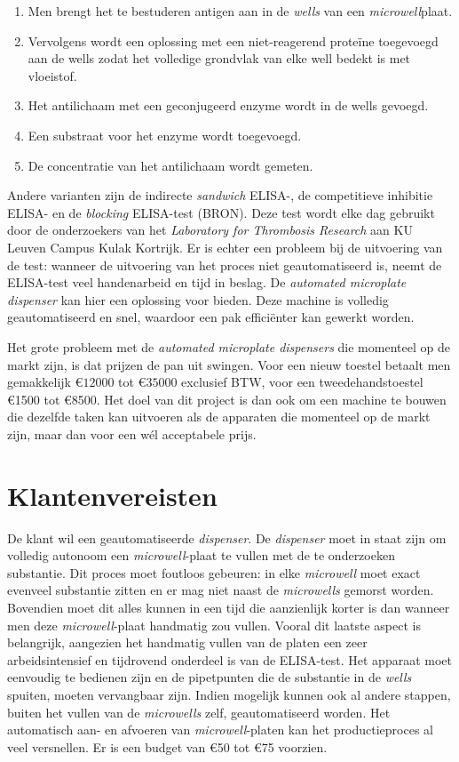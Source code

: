 \documentclass[a4paper,twoside,kulak]{kulakreport} %
\begin{document}
\begin{enumerate}
	\item Men brengt het te bestuderen antigen aan in de \textit{wells} van een \textit{microwell}plaat.
	\item Vervolgens wordt een oplossing met een niet-reagerend proteïne toegevoegd aan de wells zodat het volledige grondvlak van elke well bedekt is met vloeistof.
	\item Het antilichaam met een geconjugeerd enzyme wordt in de wells gevoegd.
	\item Een substraat voor het enzyme wordt toegevoegd. 
	\item De concentratie van het antilichaam wordt gemeten.
\end{enumerate}
Andere varianten zijn de indirecte \textit{sandwich} ELISA-, de competitieve inhibitie ELISA- en de \textit{blocking} ELISA-test (BRON).
Deze test wordt elke dag gebruikt door de onderzoekers van het \textit{Laboratory for Thrombosis Research} aan KU Leuven Campus Kulak Kortrijk. Er is echter een probleem bij de uitvoering van de test: wanneer de uitvoering van het proces niet geautomatiseerd is, neemt de ELISA-test veel handenarbeid en tijd in beslag. De \textit{automated microplate dispenser} kan hier een oplossing voor bieden. Deze machine is volledig geautomatiseerd en snel, waardoor een pak efficiënter kan gewerkt worden. 

Het grote probleem met de \textit{automated microplate dispensers} die momenteel op de markt zijn, is dat prijzen de pan uit swingen. Voor een nieuw toestel betaalt men gemakkelijk \euro $12000$ tot \euro $35000$\cite{BioSPX} exclusief BTW, voor een tweedehandstoestel \euro 1500 tot \euro 8500\cite{LabX}. Het doel van dit project is dan ook om een machine te bouwen die dezelfde taken kan uitvoeren als de apparaten die momenteel op de markt zijn, maar dan voor een wél acceptabele prijs.


\chapter{Klantenvereisten}
De klant wil een geautomatiseerde \textit{dispenser}. De \textit{dispenser} moet in staat zijn om volledig autonoom een \textit{microwell}-plaat te vullen met de te onderzoeken substantie. Dit proces moet foutloos gebeuren: in elke \textit{microwell} moet exact evenveel substantie zitten en er mag niet naast de \textit{microwells} gemorst worden. Bovendien moet dit alles kunnen in een tijd die aanzienlijk korter is dan wanneer men deze \textit{microwell}-plaat handmatig zou vullen. Vooral dit laatste aspect is belangrijk, aangezien het handmatig vullen van de platen een zeer arbeidsintensief en tijdrovend onderdeel is van de ELISA-test. Het apparaat moet eenvoudig te bedienen zijn en de pipetpunten die de substantie in de \textit{wells} spuiten, moeten vervangbaar zijn.  Indien mogelijk kunnen ook al andere stappen, buiten het vullen van de \textit{microwells} zelf, geautomatiseerd worden. Het automatisch aan- en afvoeren van \textit{microwell}-platen kan het productieproces al veel versnellen. Er is een budget van \euro 50 tot \euro 75 voorzien.
\end{document}
